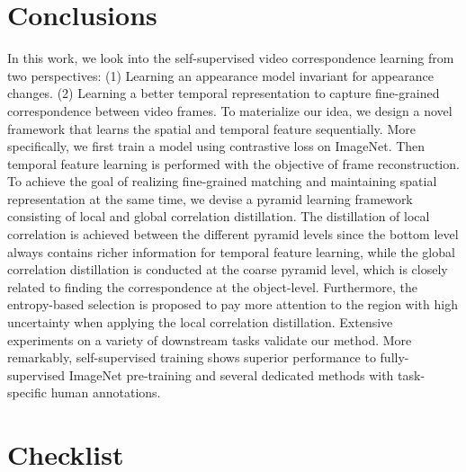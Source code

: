 \documentclass{article}
\begin{document}
\section{Conclusions}
In this work, we look into the self-supervised video correspondence learning from two perspectives: (1) Learning an appearance model invariant for appearance changes. (2) Learning a better temporal representation to capture fine-grained correspondence between video frames. To materialize our idea, we design a novel framework that learns the spatial and temporal feature sequentially. More specifically, we first train a model using contrastive loss on ImageNet. Then temporal feature learning is performed with the objective of frame reconstruction. To achieve the goal of realizing fine-grained matching and maintaining spatial representation at the same time, we devise a pyramid learning framework consisting of local and global correlation distillation. The distillation of local correlation is achieved between the different pyramid levels since the bottom level always contains richer information for temporal feature learning, while the global correlation distillation is conducted at the coarse pyramid level, which is closely related to finding the correspondence at the object-level. Furthermore, the entropy-based selection is proposed to pay more attention to the region with high uncertainty when applying the local correlation distillation. Extensive experiments on a variety of downstream tasks validate our method. More remarkably, self-supervised training shows superior performance to fully-supervised ImageNet pre-training and several dedicated methods with task-specific human annotations.


\medskip


{
\small



}
% 
% 


\section*{Checklist}
\end{document}
